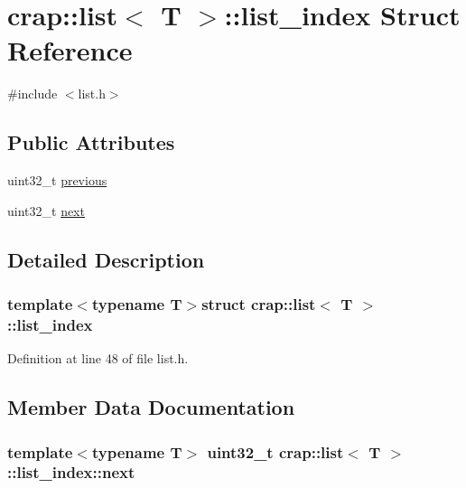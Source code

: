 \hypertarget{structcrap_1_1list_1_1list__index}{\section{crap\+:\+:list$<$ T $>$\+:\+:list\+\_\+index Struct Reference}
\label{structcrap_1_1list_1_1list__index}
}


{\ttfamily \#include $<$list.\+h$>$}

\subsection*{Public Attributes}
\begin{DoxyCompactItemize}
\item 
uint32\+\_\+t \hyperlink{structcrap_1_1list_1_1list__index_a16be27e9969e8256df96367d8de4c325}{previous}
\item 
uint32\+\_\+t \hyperlink{structcrap_1_1list_1_1list__index_a85ebc5cb08981041d102ee1a3d9f3cec}{next}
\end{DoxyCompactItemize}


\subsection{Detailed Description}
\subsubsection*{template$<$typename T$>$struct crap\+::list$<$ T $>$\+::list\+\_\+index}



Definition at line 48 of file list.\+h.



\subsection{Member Data Documentation}
\hypertarget{structcrap_1_1list_1_1list__index_a85ebc5cb08981041d102ee1a3d9f3cec}{
\subsubsection[{next}]{\setlength{\rightskip}{0pt plus 5cm}template$<$typename T$>$ uint32\+\_\+t {\bf crap\+::list}$<$ T $>$\+::list\+\_\+index\+::next}}\label{structcrap_1_1list_1_1list__index_a85ebc5cb08981041d102ee1a3d9f3cec}


